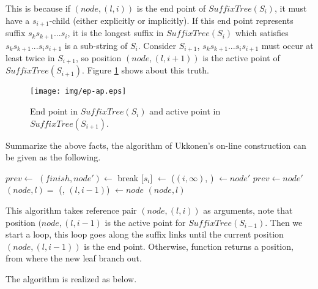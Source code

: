 \documentclass[UTF8]{article}
\begin{document}
This is because if $(node, (l, i))$ is the end point of $SuffixTree(S_i)$,
it must have a $s_{i+1}$-child (either explicitly or implicitly).
If this end point represents suffix $s_ks_{k+1}...s_i$, it is the longest
suffix in $SuffixTree(S_i)$ which satisfies $s_ks_{k+1}...s_is_{i+1}$ is a sub-string
of $S_i$. Consider $S_{i+1}$, $s_ks_{k+1}...s_is_{i+1}$ must occur at least
twice in $S_{i+1}$, so position $(node, (l, i+1))$ is the active point of
$SuffixTree(S_{i+1})$. Figure \ref{fig:ep-ap} shows about this truth.

\begin{figure}[htbp]
  \centering
  \texttt{[image: img/ep-ap.eps]}
  \caption{End point in $SuffixTree(S_i)$ and active point in $SuffixTree(S_{i+1})$.}
  \label{fig:ep-ap}
\end{figure}

Summarize the above facts, the algorithm of Ukkonen's on-line construction can
be given as the following.

\begin{algorithmic}[1]
  \State $prev \gets$   %
  \Loop {}
    \State $(finish, node') \gets$ 
      \State break
    \EndIf
    \State {}[$s_i$] $\gets$ ($(i, \infty)$, )
    \State {} $\gets node'$
    \State $prev \gets node'$
    \State $(node, l) = $ (, $(l, i-1)$)
  \EndLoop
  \State {} $\gets node$
  \State \Return $(node, l)$ 
\EndFunction
\end{algorithmic}

This algorithm takes reference pair $(node, (l, i))$ as arguments, note that
position $(node, (l, i-1)$ is the active point for $SuffixTree(S_{i-1})$.
Then we start a loop, this loop goes along the suffix links until
the current position $(node, (l, i-1))$ is the end point. Otherwise,
function  returns a position, from
where the new leaf branch out.

The  algorithm is realized as below.
\end{document}
